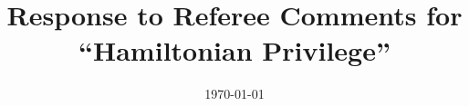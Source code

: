 \documentclass[12pt]{article}
\newcommand\bs{\begin{singlespace}}
\newcommand\es{\end{singlespace}}
\renewcommand{\=}[1]{\stackrel{#1}{=}} %
\begin{document}
\bs
\title{\vspace{-3em} \large Response to Referee Comments for ``Hamiltonian Privilege'' \vspace{-3em}}			
		
\date{\today}	
\maketitle
\es




\end{document}
